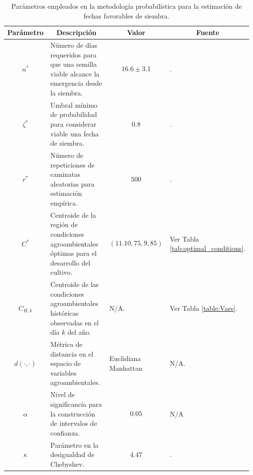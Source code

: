 \begin{table}[h]
	\centering
	\begin{tabular}{c|p{5cm}|p{2.3cm}|p{5.8cm}}
		\hline
		\textbf{Parámetro} & \multicolumn{1}{c|}{\textbf{Descripción}} & \multicolumn{1}{c|}{\textbf{Valor}} & \multicolumn{1}{c}{\textbf{Fuente}} \\
		\hline
		$n^*$ & Número de días requeridos para que una semilla viable alcance la emergencia desde la siembra. & $$16.6\pm3.1$$ &  \cite{CHMIELEWSKI_2004}. \\
		\hline
		$\zeta^*$ & Umbral mínimo de probabilidad para considerar viable una fecha de siembra. & $$0.8$$ & \citet[p. 57]{FAO_2011}. \\
		\hline
		$r^*$ & Número de repeticiones de caminatas aleatorias para estimación empírica. & $$500$$ & \cite{deAndaJauregui_2021}. \\
		\hline
		$C^*$ & Centroide de la región de condiciones agroambientales óptimas para el desarrollo del cultivo. &$$(11.10,75,9,85)$$& Ver Tabla \ref{tab:optimal_conditions}.
		\\
		\hline
		$C_{H,k}$ & Centroide de las condiciones agroambientales históricas observadas en el día $k$ del año. & 	N/A. &  Ver Tabla \ref{table:Vars}. \\
		\hline
		$d(\cdot,\cdot)$ & Métrica de distancia en el espacio de variables agroambientales. & Euclidiana \newline
		Manhattan & \begin{center}
			N/A.
		\end{center}  \\
		\hline
		$\alpha$ & Nivel de significancia para la construcción de intervalos de confianza. & $$0.05$$ &  \begin{center}
			N/A
		\end{center}  \\
		\hline
		$\kappa$ & Parámetro en la desigualdad de Chebyshev. & $$4.47$$ &  \cite{daSilva_2019}.
		\\
		\hline
	\end{tabular}
	\caption{Parámetros empleados en la metodología probabilística para la estimación de fechas favorables de siembra.}
	\label{Parameters}
\end{table}








